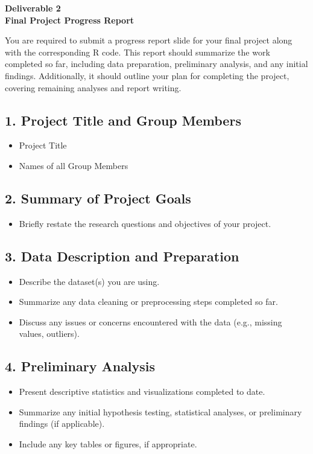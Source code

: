 \documentclass[12pt]{article}
\begin{document}
\begin{center}
    \textbf{\Large Deliverable 2 \\ Final Project Progress Report}
\end{center}

You are required to submit a progress report slide for your final project along with the corresponding R code. 
This report should summarize the work completed so far, including data preparation, preliminary analysis, and any initial findings. 
Additionally, it should outline your plan for completing the project, covering remaining analyses and report writing.

\vspace{1em}

\subsection*{1. Project Title and Group Members}
\begin{itemize}
    \item Project Title
    \item Names of all Group Members
\end{itemize}

\subsection*{2. Summary of Project Goals}
\begin{itemize}
    \item Briefly restate the research questions and objectives of your project.
\end{itemize}

\subsection*{3. Data Description and Preparation}
\begin{itemize}
    \item Describe the dataset(s) you are using.
    \item Summarize any data cleaning or preprocessing steps completed so far.
    \item Discuss any issues or concerns encountered with the data (e.g., missing values, outliers).
\end{itemize}

\subsection*{4. Preliminary Analysis}
\begin{itemize}
    \item Present descriptive statistics and visualizations completed to date.
    \item Summarize any initial hypothesis testing, statistical analyses, or preliminary findings (if applicable).
    \item Include any key tables or figures, if appropriate.
\end{itemize}
\end{document}
